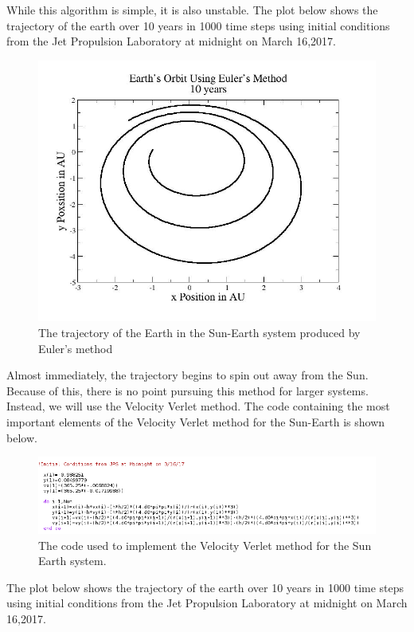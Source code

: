 \documentclass[%
oneside,                 %
final,                   %
10pt]{article}
\begin{document}
While this algorithm is simple, it is also unstable.  The plot below shows the trajectory of the earth over 10 years in 1000 time steps using initial conditions from the Jet Propulsion Laboratory \cite{JPL} at midnight on March 16,2017.

\begin{figure}[H]\label{fig:eulerplot}
  \centering
    \includegraphics[width=1.0\textwidth]{Euler.jpg}
    \caption{The trajectory of the Earth in the Sun-Earth system produced by Euler's method}
\end{figure}

Almost immediately, the trajectory begins to spin out away from the Sun.  Because of this, there is no point pursuing this method for larger systems.  Instead, we will use the Velocity Verlet method.  The code containing the most important elements of the Velocity Verlet method for the Sun-Earth is shown below.

\begin{figure}[H]\label{fig:velcode}
  \centering
    \includegraphics[width=1.0\textwidth]{VelCode.png}
    \caption{The code used to implement the Velocity Verlet method for the Sun Earth system.}
\end{figure}

The plot below shows the trajectory of the earth over 10 years in 1000 time steps using initial conditions from the Jet Propulsion Laboratory at midnight on March 16,2017.
\end{document}
